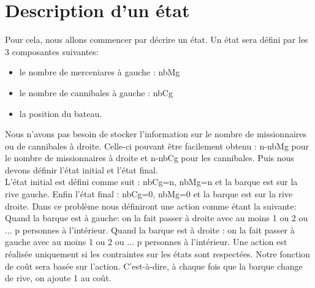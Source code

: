 \documentclass[a4paper, 12pt, french, oneside]{book}
\begin{document}
\section{Description d'un état}
Pour cela, nous allons commencer par décrire un état. Un état sera défini par les 3 composantes suivantes:
\begin{itemize}
    \item le nombre de merceniares à gauche : nbMg
    \item le nombre de cannibales à gauche : nbCg
    \item la position du bateau.
\end{itemize}
Nous n'avons pas besoin de stocker l'information sur le nombre de missionnaires ou de cannibales à droite. Celle-ci pouvant être facilement obtenu : n-nbMg pour le nombre de missionnaires à droite et n-nbCg pour les cannibales. Puis nous devons définir l'état initial et l'état final. \\
L'état initial est défini comme suit : nbCg=n, nbMg=n et la barque est sur la rive gauche. Enfin l'état final : nbCg=0, nbMg=0 et la barque est sur la rive droite. Dans ce problème nous définiront une action comme étant la suivante: Quand la barque est à gauche: on la fait passer à droite avec au moins 1 ou 2 ou ... p personnes à l'intérieur. Quand la barque est à droite : on la fait passer à gauche avec au moins 1 ou 2 ou ... p personnes à l'intérieur. Une action est réalisée uniquement si les contraintes sur les états sont respectées. Notre fonction de coût sera basée sur l'action. C'est-à-dire, à chaque fois que la barque change de rive, on ajoute 1 au coût.
\end{document}
